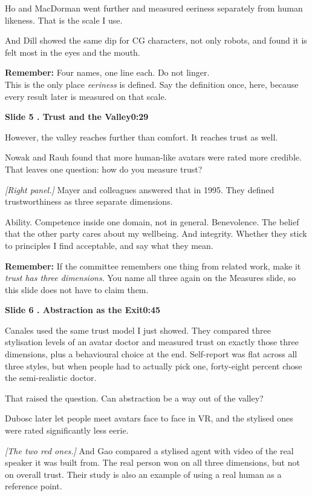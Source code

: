 \documentclass[11pt,a4paper]{article}
\newcommand{\slidehead}[3]{%
  \needspace{5\baselineskip}
  \vspace{0.9em}
  \noindent\colorbox{knblue}{\parbox{0.978\textwidth}{\vspace{1pt}\color{white}\textbf{Slide #1 \quad #2}\hfill\textbf{#3}\vspace{1pt}}}
  \vspace{0.35em}\par}
\newcommand{\remind}[1]{%
  \vspace{0.15em}
  \noindent\colorbox{knlight}{\parbox{0.972\textwidth}{\small\color{knblue}\textbf{Remember:} #1}}
  \vspace{0.2em}\par}
\newcommand{\pointto}[1]{{\color{knaccent}\textit{[#1]}}}
\begin{document}
Ho and MacDorman went further and measured eeriness separately from human likeness. That is the scale I use.

And Dill showed the same dip for CG characters, not only robots, and found it is felt most in the eyes and the mouth.

\remind{Four names, one line each. Do not linger.\\[0.4em] This is the only place \emph{eeriness} is defined. Say the definition once, here, because every result later is measured on that scale.}

\slidehead{5}{2. Trust and the Valley}{0:29}

However, the valley reaches further than comfort. It reaches trust as well.

Nowak and Rauh found that more human-like avatars were rated more credible. That leaves one question: how do you measure trust?

\pointto{Right panel.} Mayer and colleagues answered that in 1995. They defined trustworthiness as three separate dimensions.

Ability. Competence inside one domain, not in general. Benevolence. The belief that the other party cares about my wellbeing. And integrity. Whether they stick to principles I find acceptable, and say what they mean.

\remind{If the committee remembers one thing from related work, make it \emph{trust has three dimensions}. You name all three again on the Measures slide, so this slide does not have to claim them.}

\slidehead{6}{3. Abstraction as the Exit}{0:45}

Canales used the same trust model I just showed. They compared three stylisation levels of an avatar doctor and measured trust on exactly those three dimensions, plus a behavioural choice at the end. Self-report was flat across all three styles, but when people had to actually pick one, forty-eight percent chose the semi-realistic doctor.

That raised the question. Can abstraction be a way out of the valley?

Dubosc later let people meet avatars face to face in VR, and the stylised ones were rated significantly less eerie.

\pointto{The two red ones.} And Gao compared a stylised agent with video of the real speaker it was built from. The real person won on all three dimensions, but not on overall trust. Their study is also an example of using a real human as a reference point.
\end{document}
